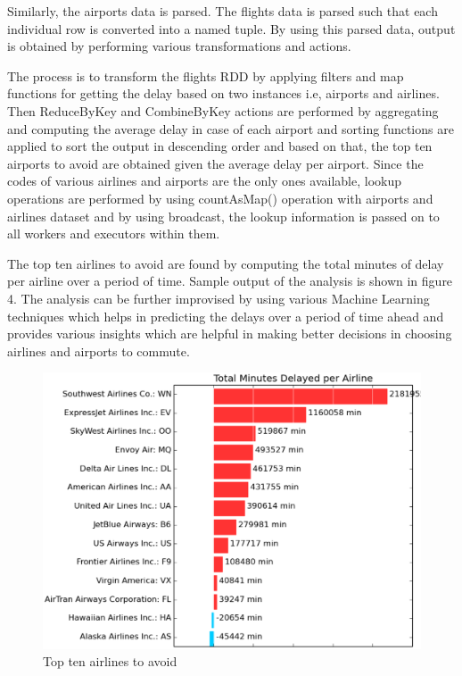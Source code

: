 \documentclass[9pt,twocolumn,twoside]{../../styles/osajnl}
\begin{document}
Similarly, the airports data is parsed.  The flights data is parsed
such that each individual row is converted into a named tuple.  By
using this parsed data, output is obtained by performing various
transformations and actions.

The process is to transform the flights RDD by applying filters and
map functions for getting the delay based on two instances i.e,
airports and airlines. Then ReduceByKey and CombineByKey actions are
performed by aggregating and computing the average delay in case of
each airport and sorting functions are applied to sort the output in
descending order and based on that, the top ten airports to avoid are
obtained given the average delay per airport. Since the codes of
various airlines and airports are the only ones available, lookup
operations are performed by using countAsMap() operation with airports
and airlines dataset and by using broadcast, the lookup information is
passed on to all workers and executors within them.

The top ten airlines to avoid are found by computing the total minutes
of delay per airline over a period of time. Sample output of the
analysis is shown in figure 4. The analysis can be further improvised
by using various Machine Learning techniques which helps in predicting
the delays over a period of time ahead and provides various insights
which are helpful in making better decisions in choosing airlines and
airports to commute.

\begin{figure}[ht]
  \includegraphics[scale=0.40]{images/airlinesAnalysis.eps}
  \caption{Top ten airlines to avoid}
\end{figure}
\end{document}

